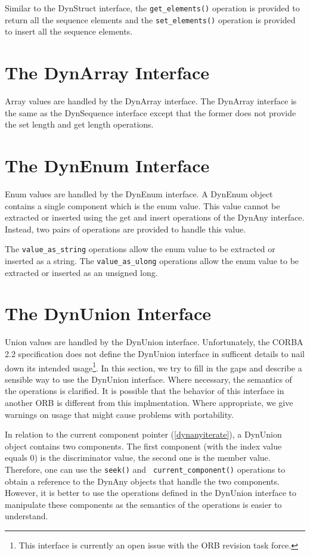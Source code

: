 \documentclass[11pt,twoside,onecolumn]{book}
\begin{document}
Similar to the DynStruct interface, the {\tt get\_elements()} operation is
provided to return all the sequence elements and the {\tt set\_elements()}
operation is provided to insert all the sequence elements.

\section{The DynArray Interface}

Array values are handled by the DynArray interface. The DynArray interface
is the same as the DynSequence interface except that the former does not
provide the set length and get length operations. 

\section{The DynEnum Interface}

Enum values are handled by the DynEnum interface. A DynEnum object contains
a single component which is the enum value. This value cannot be
extracted or inserted using the get and insert operations of the DynAny
interface. Instead, two pairs of operations are provided to handle this
value.

The {\tt value\_as\_string} operations allow the enum value to be
extracted or inserted as a string. The {\tt value\_as\_ulong} operations
allow the enum value to be extracted or inserted as an unsigned long.


\section{The DynUnion Interface}

Union values are handled by the DynUnion interface. Unfortunately, the
CORBA 2.2 specification does not define the DynUnion interface in sufficent
details to nail down its intended usage\footnote{This interface is
currently an open issue with the ORB revision task force.}. In this
section, we try to fill in the gaps and describe a sensible way to use the
DynUnion interface. Where necessary, the semantics of the operations is
clarified. It is possible that the behavior of this interface in another
ORB is different from this implmentation. Where appropriate, we give
warnings on usage that might cause problems with portability.

In relation to the current component pointer (\ref{dynanyiterate}), a
DynUnion object contains two components. The first component (with the
index value equals 0) is the discriminator value, the second one is the
member value.  Therefore, one can use the {\tt seek()} and {\tt
current\_component()} operations to obtain a reference to the DynAny
objects that handle the two components. However, it is better to use the
operations defined in the DynUnion interface to manipulate these components
as the semantics of the operations is easier to understand.
\end{document}
